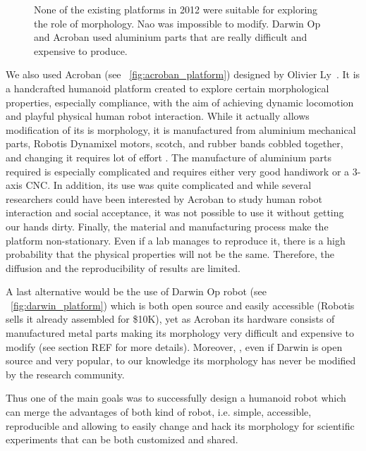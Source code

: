 \begin{figure}[]
\centering
    \hfil
    \hfil
    \caption{None of the existing platforms in 2012 were suitable for exploring the role of morphology. Nao was impossible to modify. Darwin Op and Acroban used aluminium parts that are really difficult and expensive to produce.}
    \label{fig:2012_Humanoids}
\end{figure}

We also used Acroban (see \figurename~\ref{fig:acroban_platform}) designed by Olivier Ly~\cite{Ly2010}. It is a handcrafted humanoid platform created to explore certain morphological properties, especially compliance, with the aim of achieving dynamic locomotion and playful physical human robot interaction.
While it actually allows modification of its is morphology, it is manufactured from aluminium mechanical parts, Robotis Dynamixel motors, scotch, and rubber bands cobbled together, and changing it requires lot of effort . The manufacture of aluminium parts required is especially complicated and requires either very good handiwork or a 3-axis CNC.
In addition, its use was quite complicated and while several researchers could have been interested by Acroban to study human robot interaction and social acceptance, it was not possible to use it without getting our hands dirty.
Finally, the material and manufacturing process make the platform non-stationary. Even if a lab manages to reproduce it, there is a high probability that the physical properties will not be the same. Therefore, the diffusion and the reproducibility of results are limited.


A last alternative would be the use of Darwin Op robot (see \figurename~\ref{fig:darwin_platform}) which is both open source and easily accessible (Robotis sells it already assembled for \$10K), yet as Acroban its hardware consists of manufactured metal parts making its morphology very difficult and expensive to modify (see section REF for more details). Moreover, , even if Darwin is open source and very popular, to our knowledge its morphology has never be modified by the research community.

Thus one of the main goals was to successfully design a humanoid robot which can merge the advantages of both kind of robot, i.e. simple, accessible, reproducible and allowing to easily change and hack its morphology for scientific experiments that can be both customized and shared.

